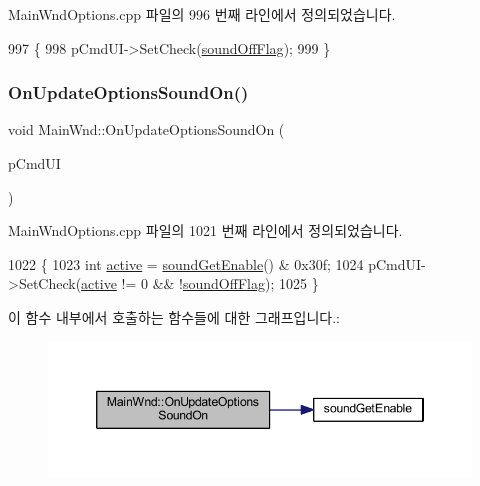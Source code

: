 Main\+Wnd\+Options.\+cpp 파일의 996 번째 라인에서 정의되었습니다.


\begin{DoxyCode}
997 \{
998   pCmdUI->SetCheck(\mbox{\hyperlink{gb_sound_8cpp_a2ff51b8fba1a4efea2d3d72f93210375}{soundOffFlag}});
999 \}
\end{DoxyCode}
\mbox{\label{class_main_wnd_a116f77e43b912bb2fcf33d746294882f}} 
\subsubsection{\texorpdfstring{On\+Update\+Options\+Sound\+On()}{OnUpdateOptionsSoundOn()}}
{\footnotesize\ttfamily void Main\+Wnd\+::\+On\+Update\+Options\+Sound\+On (\begin{DoxyParamCaption}\item[{C\+Cmd\+UI $\ast$}]{p\+Cmd\+UI }\end{DoxyParamCaption})\hspace{0.3cm}{\ttfamily [protected]}}



Main\+Wnd\+Options.\+cpp 파일의 1021 번째 라인에서 정의되었습니다.


\begin{DoxyCode}
1022 \{
1023   \textcolor{keywordtype}{int} \mbox{\hyperlink{_s_d_l_8cpp_aa5805c5e936174e5092bf7a5b78e7e64}{active}} = \mbox{\hyperlink{_sound_8cpp_a3d1f6129176583804274bb162c3428a8}{soundGetEnable}}() & 0x30f;
1024   pCmdUI->SetCheck(\mbox{\hyperlink{_s_d_l_8cpp_aa5805c5e936174e5092bf7a5b78e7e64}{active}} != 0 && !\mbox{\hyperlink{gb_sound_8cpp_a2ff51b8fba1a4efea2d3d72f93210375}{soundOffFlag}});
1025 \}
\end{DoxyCode}
이 함수 내부에서 호출하는 함수들에 대한 그래프입니다.\+:
\nopagebreak
\begin{figure}[H]
\begin{center}
\leavevmode
\includegraphics[width=346pt]{class_main_wnd_a116f77e43b912bb2fcf33d746294882f_cgraph}
\end{center}
\end{figure}
\mbox{\label{class_main_wnd_aa8de36d9ebca9c8080800573464ee464}} 
